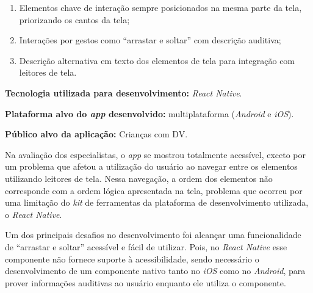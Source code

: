 \begin{enumerate}
    \item Elementos chave de interação sempre posicionados na mesma parte da tela, priorizando os cantos da tela;
    \item Interações por gestos como ``arrastar e soltar'' com descrição auditiva;
    \item Descrição alternativa em texto dos elementos de tela para integração com leitores de tela.
\end{enumerate}

\textbf{Tecnologia utilizada para desenvolvimento:} \emph{React Native}.

\textbf{Plataforma alvo do \emph{app} desenvolvido:} multiplataforma (\emph{Android} e \emph{iOS}).

\textbf{Público alvo da aplicação:} Crianças com DV\@.

Na avaliação dos especialistas, o \emph{app} se mostrou totalmente acessível, exceto por um problema que afetou a utilização do usuário ao navegar entre os elementos utilizando leitores de tela.
Nessa navegação, a ordem dos elementos não corresponde com a ordem lógica apresentada na tela, problema que ocorreu por uma limitação do \emph{kit} de ferramentas da plataforma de desenvolvimento utilizada, o \emph{React Native}.

Um dos principais desafios no desenvolvimento foi alcançar uma funcionalidade de ``arrastar e soltar'' acessível e fácil de utilizar.
Pois, no \emph{React Native} esse componente não fornece suporte à acessibilidade, sendo necessário o desenvolvimento de um componente nativo tanto no \emph{iOS} como no \emph{Android}, para prover informações auditivas ao usuário enquanto ele utiliza o componente.
